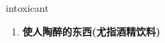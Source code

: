 
\begin{frame}
{\huge intoxicant}
\begin{center}
\begin{enumerate}\Large
  \item \textbf{使人陶醉的东西(尤指酒精饮料)}
\end{enumerate}
\end{center}
\end{frame}
